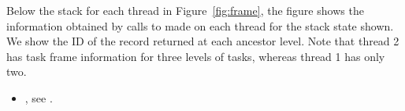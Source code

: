 Below the stack for each thread in Figure~\ref{fig:frame}, the figure
shows the  information obtained by calls to
 made on each thread for the stack state
shown. We show the ID of the  record returned at
each ancestor level. Note that thread 2 has task frame information for
three levels of tasks, whereas thread 1 has only two.

\crossreferences
\begin{itemize}
\item {}, see .
\end{itemize}




